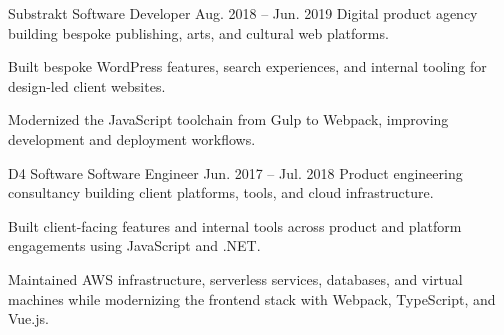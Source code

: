 \ResumeJob
  {Substrakt}
  {Software Developer}
  {Aug. 2018 -- Jun. 2019}
  {Digital product agency building bespoke publishing, arts, and cultural web platforms.}
\begin{ResumeList}
  \item Built bespoke WordPress features, search experiences, and internal tooling for design-led client websites.
  \item Modernized the JavaScript toolchain from Gulp to Webpack, improving development and deployment workflows.
\end{ResumeList}

\ResumeJob
  {D4 Software}
  {Software Engineer}
  {Jun. 2017 -- Jul. 2018}
  {Product engineering consultancy building client platforms, tools, and cloud infrastructure.}
\begin{ResumeList}
  \item Built client-facing features and internal tools across product and platform engagements using JavaScript and .NET.
  \item Maintained AWS infrastructure, serverless services, databases, and virtual machines while modernizing the frontend stack with Webpack, TypeScript, and Vue.js.
\end{ResumeList}
